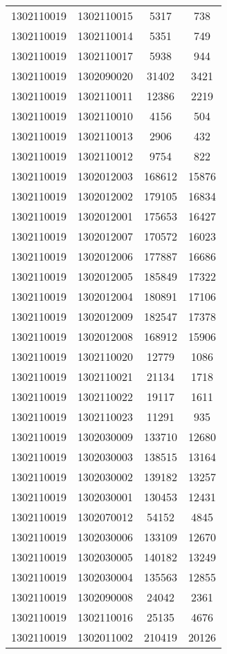 \begin{longtable}{llcc}
1302110019 & 1302110015 & 5317 & 738\\
1302110019 & 1302110014 & 5351 & 749\\
1302110019 & 1302110017 & 5938 & 944\\
1302110019 & 1302090020 & 31402 & 3421\\
1302110019 & 1302110011 & 12386 & 2219\\
1302110019 & 1302110010 & 4156 & 504\\
1302110019 & 1302110013 & 2906 & 432\\
1302110019 & 1302110012 & 9754 & 822\\
1302110019 & 1302012003 & 168612 & 15876\\
1302110019 & 1302012002 & 179105 & 16834\\
1302110019 & 1302012001 & 175653 & 16427\\
1302110019 & 1302012007 & 170572 & 16023\\
1302110019 & 1302012006 & 177887 & 16686\\
1302110019 & 1302012005 & 185849 & 17322\\
1302110019 & 1302012004 & 180891 & 17106\\
1302110019 & 1302012009 & 182547 & 17378\\
1302110019 & 1302012008 & 168912 & 15906\\
1302110019 & 1302110020 & 12779 & 1086\\
1302110019 & 1302110021 & 21134 & 1718\\
1302110019 & 1302110022 & 19117 & 1611\\
1302110019 & 1302110023 & 11291 & 935\\
1302110019 & 1302030009 & 133710 & 12680\\
1302110019 & 1302030003 & 138515 & 13164\\
1302110019 & 1302030002 & 139182 & 13257\\
1302110019 & 1302030001 & 130453 & 12431\\
1302110019 & 1302070012 & 54152 & 4845\\
1302110019 & 1302030006 & 133109 & 12670\\
1302110019 & 1302030005 & 140182 & 13249\\
1302110019 & 1302030004 & 135563 & 12855\\
1302110019 & 1302090008 & 24042 & 2361\\
1302110019 & 1302110016 & 25135 & 4676\\
1302110019 & 1302011002 & 210419 & 20126\\

\end{longtable}
